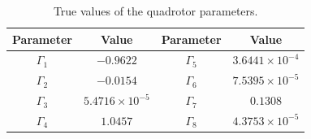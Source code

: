 \documentclass[3p]{elsarticle}
\begin{document}
\begin{table}[H]
	\renewcommand{\arraystretch}{1.3}
	\caption{True values of the quadrotor parameters.}
	\vspace{-0.5cm}
	\begin{center}
	\begin{tabular}{c c c c}
	\hline
	Parameter & Value & Parameter & Value  \\
	\hline
	$\Gamma_1$ & $-0.9622$ & $\Gamma_5$ & $3.6441\times10^{-4}$ \\

	$\Gamma_2$ & $-0.0154$ & $\Gamma_6$ & $7.5395\times10^{-5}$ \\

	$\Gamma_3$ &$5.4716\times10^{-5}$ & $\Gamma_7$ & $0.1308$ \\

	$\Gamma_4$ & $1.0457$ & $\Gamma_8$ & $4.3753\times10^{-5}$ \\
	\hline
	\end{tabular}
	\label{tab:true_parameters}
	\end{center}
\end{table}
\end{document}

